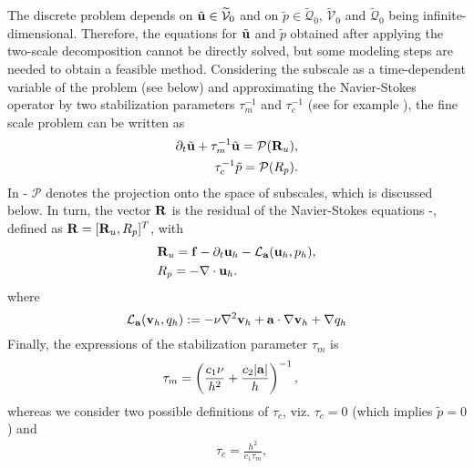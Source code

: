 The discrete problem depends on $\tilde{{\bf u}} \in \widetilde{\mathcal{V}}_0$ and on $\tilde{p}\in \widetilde{\mathcal{Q}}_0$,  $\widetilde{\mathcal{V}}_0$ and $\widetilde{\mathcal{Q}}_0$ being infinite-dimensional. Therefore, the equations for $\tilde{{\bf u}}$ and $\tilde{p}$ obtained after applying the two-scale decomposition cannot be directly solved, but some modeling steps are needed to obtain a feasible method. Considering the subscale as a time-dependent variable of the problem (see below) and approximating the Navier-Stokes operator by two stabilization parameters $\tau_m^{-1}$ and $\tau_c^{-1}$ (see for example \cite{codina_time_2007}), the fine scale problem can be written as
\begin{align}
\label{eq-C2_velo_sgs}
\partial_t\tilde{{\bf u}}+\tau_m^{-1}\tilde{{\bf u}}=\mathcal{P}({\bf R}_u),\\
\label{eq-C2_press_sgs}
\tau_c^{-1}\tilde{p}=\mathcal{P}(R_p).
\end{align}
In - $\mathcal{P}$ denotes the projection onto the space of subscales, which is discussed below. In turn, the vector ${\bf R}$ is the residual of the Navier-Stokes equations -, defined as ${\bf R}=[{\bf R}_u,R_p]^T$, with
\begin{align}
\label{eq-C2_Ru}
&{\bf R}_u={\bf f}-\partial_t{\bf u}_h-\mathcal{L}_{{\bf a}}({\bf u}_h,p_h),\\
\label{eq-C2_Rp}
&R_p=-\nabla\cdot{\bf u}_h.
\end{align}
where
\begin{equation}
\label{eq-C2_operator}
\mathcal{L}_{{\bf a}}({\bf v}_h,q_h):=-\nu\nabla^2{\bf v}_h+{\bf a}\cdot\nabla{\bf v}_h+\nabla q_h
\end{equation}
Finally, the expressions of the stabilization parameter $\tau_m$ is 
\begin{align}
\label{eq-C2_tau_m}
&\tau_m=\left(\frac{c_1\nu}{h^2}+\frac{c_2|{\bf a}|}{h}\right)^{-1},
\end{align}
whereas we consider two possible definitions of $\tau_c$, viz. $\tau_c = 0$ (which implies $\tilde{p} = 0$) and 
\begin{align}
\label{eq-C2_tau_c}
&\tau_c=\frac{h^2}{c_1\tau_m},
\end{align}
